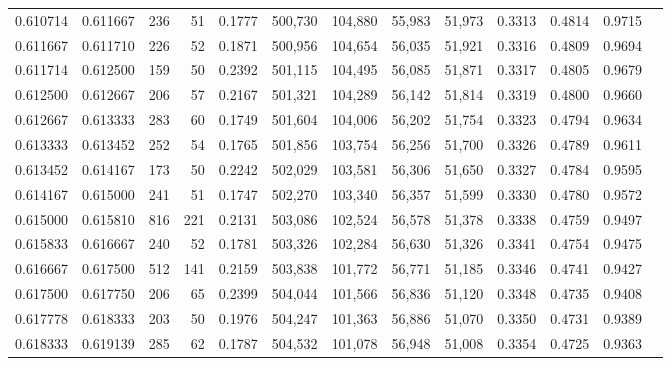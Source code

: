 \begin{tabular}{rrrrrrrrrrrrr}
0.610714 & 0.611667 &   236 &  51 &                                     0.1777 & 500,730 & 104,880 &  55,983 &  51,973 & 0.3313 & 0.4814 & 0.9715 \\
0.611667 & 0.611710 &   226 &  52 &                                     0.1871 & 500,956 & 104,654 &  56,035 &  51,921 & 0.3316 & 0.4809 & 0.9694 \\
0.611714 & 0.612500 &   159 &  50 &                                     0.2392 & 501,115 & 104,495 &  56,085 &  51,871 & 0.3317 & 0.4805 & 0.9679 \\
0.612500 & 0.612667 &   206 &  57 &                                     0.2167 & 501,321 & 104,289 &  56,142 &  51,814 & 0.3319 & 0.4800 & 0.9660 \\
0.612667 & 0.613333 &   283 &  60 &                                     0.1749 & 501,604 & 104,006 &  56,202 &  51,754 & 0.3323 & 0.4794 & 0.9634 \\
0.613333 & 0.613452 &   252 &  54 &                                     0.1765 & 501,856 & 103,754 &  56,256 &  51,700 & 0.3326 & 0.4789 & 0.9611 \\
0.613452 & 0.614167 &   173 &  50 &                                     0.2242 & 502,029 & 103,581 &  56,306 &  51,650 & 0.3327 & 0.4784 & 0.9595 \\
0.614167 & 0.615000 &   241 &  51 &                                     0.1747 & 502,270 & 103,340 &  56,357 &  51,599 & 0.3330 & 0.4780 & 0.9572 \\
0.615000 & 0.615810 &   816 & 221 &                                     0.2131 & 503,086 & 102,524 &  56,578 &  51,378 & 0.3338 & 0.4759 & 0.9497 \\
0.615833 & 0.616667 &   240 &  52 &                                     0.1781 & 503,326 & 102,284 &  56,630 &  51,326 & 0.3341 & 0.4754 & 0.9475 \\
0.616667 & 0.617500 &   512 & 141 &                                     0.2159 & 503,838 & 101,772 &  56,771 &  51,185 & 0.3346 & 0.4741 & 0.9427 \\
0.617500 & 0.617750 &   206 &  65 &                                     0.2399 & 504,044 & 101,566 &  56,836 &  51,120 & 0.3348 & 0.4735 & 0.9408 \\
0.617778 & 0.618333 &   203 &  50 &                                     0.1976 & 504,247 & 101,363 &  56,886 &  51,070 & 0.3350 & 0.4731 & 0.9389 \\
0.618333 & 0.619139 &   285 &  62 &                                     0.1787 & 504,532 & 101,078 &  56,948 &  51,008 & 0.3354 & 0.4725 & 0.9363 \\

\end{tabular}
